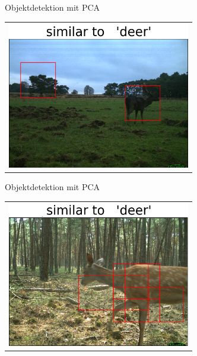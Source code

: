 \begin{frame}[t,fragile]{Objektdetektion mit PCA}
  \vspace{0.01em}
  {
\begin{table}
\centering
        \begin{tabular}{c}
        \includegraphics[width=8cm]{img/Segmentierung/seg(2).png}\\
         \end{tabular}
\end{table}
 }

\end{frame}


\begin{frame}[t,fragile]{Objektdetektion mit PCA}
  \vspace{0.01em}
  {
\begin{table}
\centering
        \begin{tabular}{c}
        \includegraphics[width=8cm]{img/Segmentierung/seg(3).png}\\
         \end{tabular}
\end{table}
 }

\end{frame}


